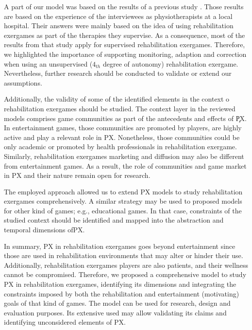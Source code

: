 A part of our model was based on the results of a previous study . Those results are based on the experience of the interviewees as physiotherapists at a local hospital. Their answers were mainly based on the idea of using rehabilitation exergames as part of the therapies they supervise. As a consequence, most of the results from that study apply for supervised rehabilitation exergames. Therefore, we highlighted the importance of supporting monitoring, adaption and correction when using an unsupervised ($4_{th}$ degree of autonomy) rehabilitation exergame. Nevertheless, further research should be conducted to validate or extend our assumptions.

Additionally, the validity of some of the identified elements in the context o rehabilitation exergames should be studied. The context layer in the reviewed models comprises game communities as part of the antecedents and effects of \c{PX}. In entertainment games, those communities are promoted by players, are highly active and play a relevant role in \ac{PX}. Nonetheless, those communities could be only academic or promoted by health professionals in rehabilitation exergame. Similarly, rehabilitation exergames marketing and diffusion may also be different from entertainment games. As a result, the role of communities and game market in \ac{PX} and their nature remain open for research.

The employed approach allowed us to extend \ac{PX} models to study rehabilitation exergames comprehensively. A similar strategy may be used to proposed models for other kind of games; e.g., educational games. In that case, constraints of the studied context should be identified and mapped into the abstraction and temporal dimensions of\ac{PX}.

In summary, \ac{PX} in rehabilitation exergames goes beyond entertainment since those are used in rehabilitation environments that may alter or hinder their use. Additionally, rehabilitation exergames players are also patients, and their wellness cannot be compromised. Therefore, we proposed a comprehensive model to study \ac{PX} in rehabilitation exergames, identifying its dimensions and integrating the constraints imposed by both the rehabilitation and entertainment (motivating) goals of that kind of games. The model can be used for research, design and evaluation purposes. Its extensive used may allow validating its claims and identifying unconsidered elements of \ac{PX}. 

